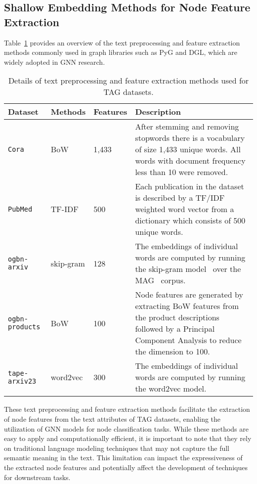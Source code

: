 \documentclass{article}
\begin{document}
\subsection{Shallow Embedding Methods for Node Feature Extraction}

Table~\ref{tab: text preprocess} provides an overview of the text preprocessing and feature extraction methods commonly used in graph libraries such as PyG and DGL, which are widely adopted in GNN research.

\begin{table}[!ht]
\caption{Details of text preprocessing and feature extraction methods used for TAG datasets.}
\small
    \label{tab: text preprocess}
    \centering
    \begin{tabularx}{\textwidth}{lllX}
    \toprule
         Dataset  &Methods & Features & Description \\
         \midrule
         \texttt{Cora}
         & BoW
         & 1,433
         & After stemming and removing stopwords there is a vocabulary of size 1,433 unique words. All words with document frequency less than 10 were removed.\\
\midrule
         \texttt{PubMed} 
         & TF-IDF
         & 500
         & Each publication in the dataset is described by a TF/IDF weighted word vector from a dictionary which consists of 500 unique words. \\
         \midrule
         \texttt{ogbn-arxiv}
         & skip-gram
         & 128
         & The embeddings of individual words are computed by running the skip-gram model~\citep{mikolov2013distributed_skipgram} over the MAG~\citep{wang2020microsoft_mag} corpus.\\
         \midrule
         \texttt{ogbn-products} 
         & BoW
         & 100
         & Node features are generated by extracting BoW features from the product descriptions followed by a Principal Component Analysis to reduce the dimension to 100.
         \\
         \midrule
         \texttt{tape-arxiv23}
         & word2vec
         & 300
         & The embeddings of individual words are computed by running the word2vec model.
         \\
         \bottomrule
    \end{tabularx}
\end{table}

These text preprocessing and feature extraction methods facilitate the extraction of node features from the text attributes of TAG datasets, enabling the utilization of GNN models for node classification tasks. While these methods are easy to apply and computationally efficient, it is important to note that they rely on traditional language modeling techniques that may not capture the full semantic meaning in the text. This limitation can impact the expressiveness of the extracted node features and potentially affect the development of techniques for downstream tasks.
\end{document}
